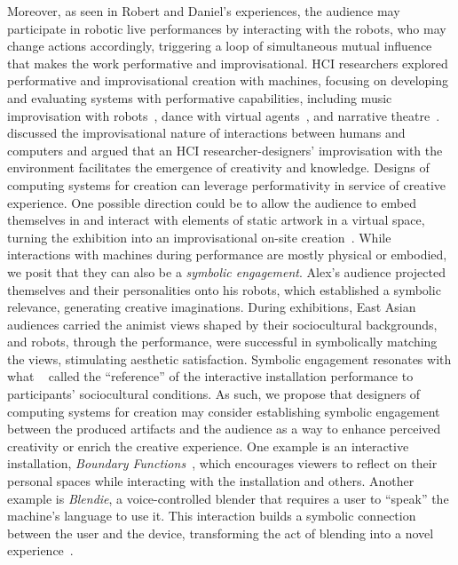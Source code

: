Moreover, as seen in Robert and Daniel's experiences, the audience may participate in robotic live performances by interacting with the robots, who may change actions accordingly, triggering a loop of simultaneous mutual influence that makes the work performative and improvisational.
HCI researchers explored performative and improvisational creation with machines, focusing on developing and evaluating systems with performative capabilities, including music improvisation with robots~\cite{hoffman2010shimon}, dance with virtual agents~\cite{jacob2015viewpoints, triebus2023precious}, and narrative theatre~\cite{magerko2011employing, piplica2012full}. \citet{kang2018intermodulation} discussed the improvisational nature of interactions between humans and computers and argued that an HCI researcher-designers' improvisation with the environment facilitates the emergence of creativity and knowledge. Designs of computing systems for creation can leverage performativity in service of creative experience. One possible direction could be to allow the audience to embed themselves in and interact with elements of static artwork in a virtual space, turning the exhibition into an improvisational on-site creation~\cite{zhou2023painterly}.
While interactions with machines during performance are mostly physical or embodied, we posit that they can also be a \textit{symbolic engagement}. Alex's audience projected themselves and their personalities onto his robots, which established a symbolic relevance, generating creative imaginations. During exhibitions, East Asian audiences carried the animist views shaped by their sociocultural backgrounds, and robots, through the performance, were successful in symbolically matching the views, stimulating aesthetic satisfaction. Symbolic engagement resonates with what ~\citet{nam2014interactive} called the ``reference'' of the interactive installation performance to participants' sociocultural conditions.
As such, we propose that designers of computing systems for creation may consider establishing symbolic engagement between the produced artifacts and the audience as a way to enhance perceived creativity or enrich the creative experience. One example is an interactive installation, \textit{Boundary Functions}~\cite{snibbe1998}, which encourages viewers to reflect on their personal spaces while interacting with the installation and others. Another example is \textit{Blendie}, a voice-controlled blender that requires a user to ``speak'' the machine's language to use it. This interaction builds a symbolic connection between the user and the device, transforming the act of blending into a novel experience~\cite{dobson2004blendie}.


